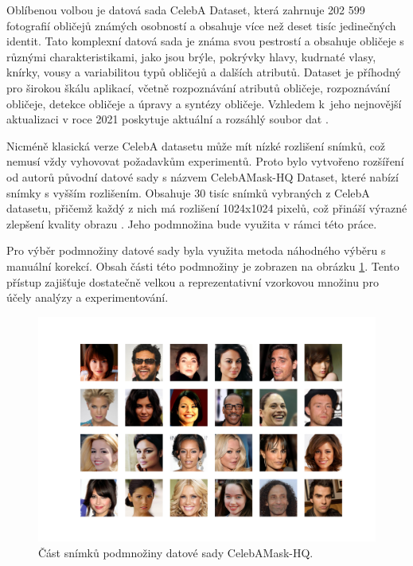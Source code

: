 Oblíbenou volbou je datová sada CelebA Dataset, která zahrnuje 202 599 fotografií obličejů známých osobností a obsahuje více než deset tisíc jedinečných identit. Tato komplexní datová sada je známa svou pestrostí a obsahuje obličeje s různými charakteristikami, jako jsou brýle, pokrývky hlavy, kudrnaté vlasy, knírky, vousy a variabilitou typů obličejů a dalších atributů. Dataset je příhodný pro širokou škálu aplikací, včetně rozpoznávání atributů obličeje, rozpoznávání obličeje, detekce obličeje a úpravy a syntézy obličeje. Vzhledem k~jeho nejnovější aktualizaci v roce 2021 poskytuje aktuální a rozsáhlý soubor dat \cite{CelebADataset}. 

Nicméně klasická verze CelebA datasetu může mít nízké rozlišení snímků, což nemusí vždy vyhovovat požadavkům experimentů. Proto bylo vytvořeno rozšíření od autorů původní datové sady s názvem CelebAMask-HQ Dataset, které nabízí snímky s vyšším rozlišením. Obsahuje 30 tisíc snímků vybraných z CelebA datasetu, přičemž každý z nich má rozlišení 1024x1024 pixelů, což přináší výrazné zlepšení kvality obrazu \cite{CelebAMask-HQ}. Jeho podmnožina bude využita v rámci této práce.

Pro výběr podmnožiny datové sady byla využita metoda náhodného výběru s manuální korekcí. Obsah části této podmnožiny je zobrazen na obrázku \ref{fig:CelebAMask-HQ-subset}. Tento přístup zajišťuje dostatečně velkou a reprezentativní vzorkovou množinu pro účely analýzy a experimentování.

\begin{figure}[hbt]
	\centering
	\includegraphics[width=1\textwidth]{obrazky-figures/subset-grid.png}
	\caption{Část snímků podmnožiny datové sady CelebAMask-HQ.}
        \label{fig:CelebAMask-HQ-subset}
\end{figure}

